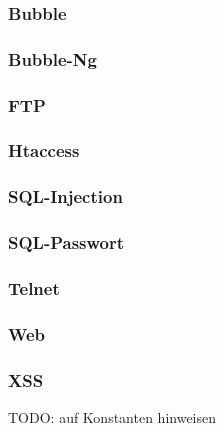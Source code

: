 \subsubsection{Bubble}

\subsubsection{Bubble-Ng}

\subsubsection{FTP}

\subsubsection{Htaccess}

\subsubsection{SQL-Injection}

\subsubsection{SQL-Passwort}

\subsubsection{Telnet}

\subsubsection{Web}

\subsubsection{XSS}



TODO: auf Konstanten hinweisen